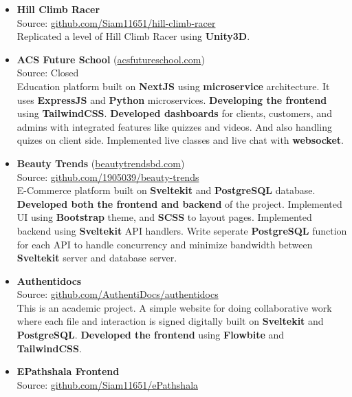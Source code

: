 
\begin{itemize}
  \item {
    \textbf{Hill Climb Racer} \\
    Source: \href{https://github.com/Siam11651/hill-climb-racer}{github.com/Siam11651/hill-climb-racer} \\
    Replicated a level of Hill Climb Racer using \textbf{Unity3D}.
  }
  \item {
    \textbf{ACS Future School} (\href{https://www.acsfutureschool.com}{acsfutureschool.com}) \\
    Source: Closed \\
    Education platform built on \textbf{NextJS} using \textbf{microservice} architecture. It uses \textbf{ExpressJS} and \textbf{Python} microservices. \textbf{Developing the frontend} using \textbf{TailwindCSS}. \textbf{Developed dashboards} for clients, customers, and admins with integrated features like quizzes and videos. And also handling quizes on client side. Implemented live classes and live chat with \textbf{websocket}.
  }
  \item {
    \textbf{Beauty Trends} (\href{https://www.beautytrendsbd.com}{beautytrendsbd.com}) \\
    Source: \href{https://github.com/1905039/beauty-trends}{github.com/1905039/beauty-trends} \\
    E-Commerce platform built on \textbf{Sveltekit} and \textbf{PostgreSQL} database. \textbf{Developed both the frontend and backend} of the project. Implemented UI using \textbf{Bootstrap} theme, and \textbf{SCSS} to layout pages. Implemented backend using \textbf{Sveltekit} API handlers. Write seperate \textbf{PostgreSQL} function for each API to handle concurrency and minimize bandwidth between \textbf{Sveltekit} server and database server.
  }
  \item {
      \textbf{Authentidocs} \\
      Source: \href{https://github.com/AuthentiDocs/authentidocs}{github.com/AuthentiDocs/authentidocs} \\
      This is an academic project. A simple website for doing collaborative work where each file and interaction is signed digitally built on \textbf{Sveltekit} and \textbf{PostgreSQL}. \textbf{Developed the frontend} using \textbf{Flowbite} and \textbf{TailwindCSS}.
    }
  \item {
    \textbf{EPathshala Frontend} \\
    Source: \href{https://github.com/Siam11651/ePathshala}{github.com/Siam11651/ePathshala} \\
}
\end{itemize}
